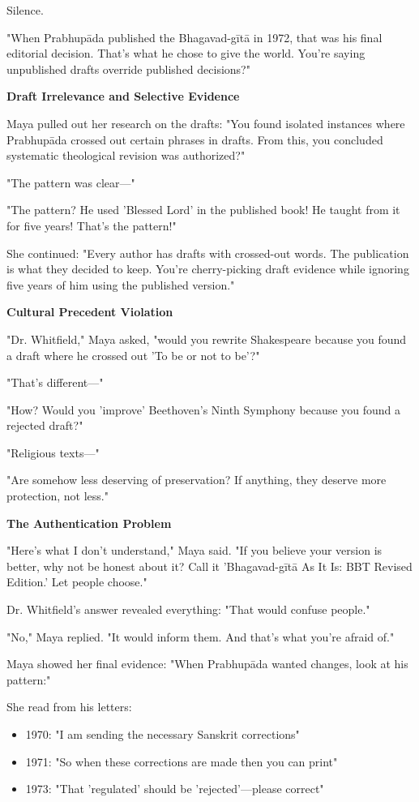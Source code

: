 \documentclass[12pt,twoside]{book}
\begin{document}
Silence.

"When Prabhupāda published the Bhagavad-gītā in 1972, that was his final editorial decision. That's what he chose to give the world. You're saying unpublished drafts override published decisions?"

\textbf{\textbf{\textbf{Draft Irrelevance and Selective Evidence}}}

Maya pulled out her research on the drafts: "You found isolated instances where Prabhupāda crossed out certain phrases in drafts. From this, you concluded systematic theological revision was authorized?"

"The pattern was clear—"

"The pattern? He used 'Blessed Lord' in the published book! He taught from it for five years! That's the pattern!"

She continued: "Every author has drafts with crossed-out words. The publication is what they decided to keep. You're cherry-picking draft evidence while ignoring five years of him using the published version."

\textbf{\textbf{\textbf{Cultural Precedent Violation}}}

"Dr. Whitfield," Maya asked, "would you rewrite Shakespeare because you found a draft where he crossed out 'To be or not to be'?"

"That's different—"

"How? Would you 'improve' Beethoven's Ninth Symphony because you found a rejected draft?"

"Religious texts—"

"Are somehow less deserving of preservation? If anything, they deserve more protection, not less."

\textbf{\textbf{\textbf{The Authentication Problem}}}

"Here's what I don't understand," Maya said. "If you believe your version is better, why not be honest about it? Call it 'Bhagavad-gītā As It Is: BBT Revised Edition.' Let people choose."

Dr. Whitfield's answer revealed everything: "That would confuse people."

"No," Maya replied. "It would inform them. And that's what you're afraid of."

Maya showed her final evidence: "When Prabhupāda wanted changes, look at his pattern:"

She read from his letters:
\begin{itemize}
\item 1970: "I am sending the necessary Sanskrit corrections"
\item 1971: "So when these corrections are made then you can print"
\item 1973: "That 'regulated' should be 'rejected'—please correct"
\end{itemize}
\end{document}
